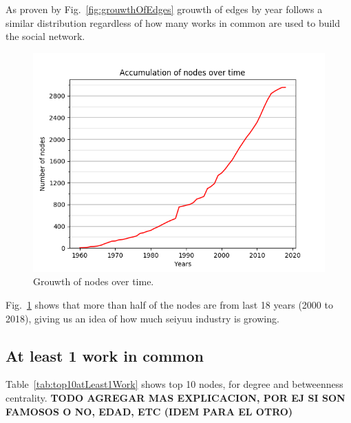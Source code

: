 As proven by Fig.~\ref{fig:grouwthOfEdges} grouwth of edges by year follows a similar distribution regardless of how many works in common are used to build the social network.

\begin{figure}[!hbt]
	\begin{center}
	\includegraphics[width=\columnwidth]{graphics/nodesAccumulation.png}
	\caption{Grouwth of nodes over time.}
	\label{fig:grouwthOfNodes}
	\end{center}
\end{figure}
 
Fig.~\ref{fig:grouwthOfNodes} shows that more than half of the nodes are from last 18 years (2000 to 2018), giving us an idea of how much seiyuu industry is growing.

\subsection{At least 1 work in common}
Table~\ref{tab:top10atLeast1Work} shows top 10 nodes, for degree and betweenness centrality. \textbf{TODO AGREGAR MAS EXPLICACION, POR EJ SI SON FAMOSOS O NO, EDAD, ETC (IDEM PARA EL OTRO)}

